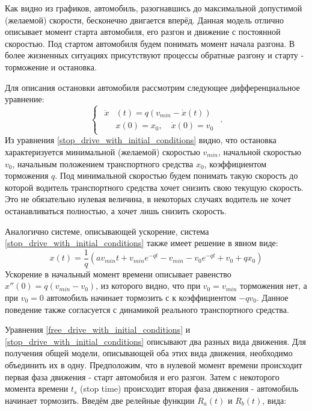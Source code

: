 \documentclass[12pt, a4paper]{extarticle}
\numberwithin{equation}{section}
\begin{document}
Как видно из графиков, автомобиль, разогнавшись до максимальной допустимой (желаемой) скорости, бесконечно двигается вперёд. Данная модель отлично описывает момент старта автомобиля, его разгон и движение с постоянной скоростью. Под стартом автомобиля будем понимать момент начала разгона. В более жизненных ситуациях присутствуют процессы обратные разгону и старту - торможение и остановка.

Для описания остановки автомобиля рассмотрим следующее дифференциальное уравнение: 
\begin{equation} \label{stop_drive_with_initial_conditions}
\begin{cases}
\begin{split}
\ddot{x}&(t) = q\left( v_{min} - \dot{x}(t)\right) \\
&x(0)=x_0, \quad \dot{x}(0)=v_0
\end{split}
\end{cases}.
\end{equation}
Из уравнения \eqref{stop_drive_with_initial_conditions} видно, что остановка характеризуется минимальной (желаемой) скоростью $v_{min}$, начальной скоростью $v_{0}$, начальным положением транспортного средства $x_0$, коэффициентом торможения $q$. Под минимальной скоростью будем понимать такую скорость до которой водитель транспортного средства хочет снизить свою текущую скорость. Это не обязательно нулевая величина, в некоторых случаях водитель не хочет останавливаться полностью, а хочет лишь снизить скорость.

Аналогично системе, описывающей ускорение, система \eqref{stop_drive_with_initial_conditions} также имеет решение в явном виде:
\begin{equation*}
x(t) = \dfrac{1}{q}\left(av_{min}t+v_{min}e^{-qt}-v_{min}-v_0e^{-qt}+v_0+qx_0\right) 
\end{equation*}
Ускорение в начальный момент времени описывает равенство $x''(0)=q(v_{min}-v_0)$, из которого видно, что при $v_0=v_{min}$ торможения нет, а при $v_0=0$ автомобиль начинает тормозить с к коэффициентом $-qv_0$. Данное поведение также согласуется с динамикой реального транспортного средства.

Уравнения \eqref{free_drive_with_initial_conditions} и  \eqref{stop_drive_with_initial_conditions} описывают два разных вида движения. Для получения общей модели, описывающей оба этих вида движения, необходимо объединить их в одну. Предположим, что в нулевой момент времени происходит первая фаза движения - старт автомобиля и его разгон. Затем с некоторого момента времени $t_s$ (stop time) происходит вторая фаза движения - автомобиль начинает тормозить. Введём две релейные функции $R_{a}(t)$ и $R_{b}(t)$, вида:  
\end{document}
